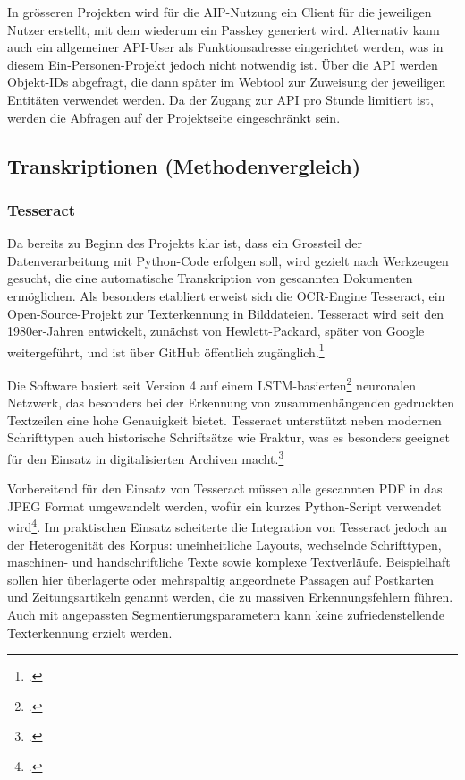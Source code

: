 \documentclass[12pt, a4paper, ngerman, bidi=default]{article}
\let\cite\footcite
\begin{document}
In grösseren Projekten wird für die AIP-Nutzung ein Client für die jeweiligen Nutzer erstellt, mit dem wiederum ein Passkey generiert wird. Alternativ kann auch ein allgemeiner API-User als Funktionsadresse eingerichtet werden, was in diesem Ein-Personen-Projekt jedoch nicht notwendig ist. Über die API werden Objekt-IDs abgefragt, die dann später im Webtool zur Zuweisung der jeweiligen Entitäten verwendet werden. Da der Zugang zur API pro Stunde limitiert ist, werden die Abfragen auf der Projektseite eingeschränkt sein.


\newpage
\subsection{Transkriptionen (Methodenvergleich)}\label{section:Transkriptionen_Methoden}
\subsubsection{Tesseract}\label{subsubsection:Tesseract}

Da bereits zu Beginn des Projekts klar ist, dass ein Grossteil der Datenverarbeitung mit Python-Code erfolgen soll, wird gezielt 
nach Werkzeugen gesucht, die eine automatische Transkription von gescannten Dokumenten ermöglichen. 
Als besonders etabliert erweist sich die OCR-Engine Tesseract, ein Open-Source-Projekt zur Texterkennung in Bilddateien. 
Tesseract wird seit den 1980er-Jahren entwickelt, zunächst von Hewlett-Packard, später von Google weitergeführt, 
und ist über GitHub öffentlich zugänglich.\cite[vgl.][]{weil_tesseract-ocrtesseract_2025}

Die Software basiert seit Version 4 auf einem LSTM-basierten\cite[Abk.: \textbf{LSTM} steht für \textit{Long Short-Term Memory};  Architektur der frühen Generation rekurrenter neuronaler Netzwerke \textit{RNNs}. LSTMs wurden entwickelt, um Sequenzdaten zu verarbeiten und dabei sowohl kurzfristige als auch langfristige Abhängigkeiten in der Datenfolge zu erfassen – ein typisches Beispiel sind Texte, Sprache, oder Handschrift; vgl.][p.1-2]{beck_review_2020} neuronalen Netzwerk, das besonders bei der Erkennung von zusammenhängenden gedruckten Textzeilen eine 
hohe Genauigkeit bietet. Tesseract unterstützt neben modernen Schrifttypen auch historische Schriftsätze wie Fraktur, was es besonders geeignet 
für den Einsatz in digitalisierten Archiven macht.\cite[vgl.][]{weil_tesseract-ocrtesseract_2025}

Vorbereitend für den Einsatz von Tesseract müssen alle gescannten PDF in das JPEG Format umgewandelt werden, wofür ein kurzes Python-Script verwendet wird\cite[vgl.][]{burkhardt_githubpdf_to_jpegpy_2025}. 
Im praktischen Einsatz scheiterte die Integration von Tesseract jedoch an der Heterogenität des Korpus: uneinheitliche Layouts, wechselnde 
Schrifttypen, maschinen- und handschriftliche Texte sowie komplexe Textverläufe. Beispielhaft sollen hier überlagerte oder mehrspaltig angeordnete 
Passagen auf Postkarten und Zeitungsartikeln genannt werden, die zu massiven Erkennungsfehlern führen. Auch mit angepassten Segmentierungsparametern kann keine zufriedenstellende Texterkennung erzielt werden.
\end{document}
